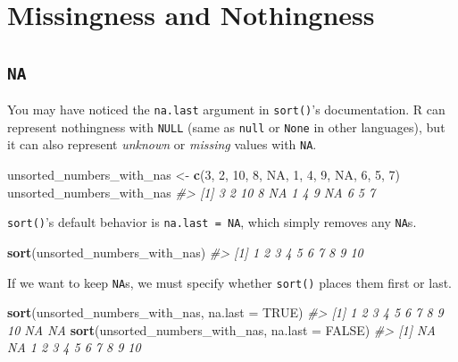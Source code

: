 \documentclass[
]{report}
\newenvironment{Shaded}{\begin{snugshade}}{\end{snugshade}}
\newcommand{\CommentTok}[1]{\textcolor[rgb]{0.56,0.35,0.01}{\textit{#1}}}
\newcommand{\DataTypeTok}[1]{\textcolor[rgb]{0.13,0.29,0.53}{#1}}
\newcommand{\DecValTok}[1]{\textcolor[rgb]{0.00,0.00,0.81}{#1}}
\newcommand{\KeywordTok}[1]{\textcolor[rgb]{0.13,0.29,0.53}{\textbf{#1}}}
\newcommand{\NormalTok}[1]{#1}
\newcommand{\OtherTok}[1]{\textcolor[rgb]{0.56,0.35,0.01}{#1}}
\newcommand{\StringTok}[1]{\textcolor[rgb]{0.31,0.60,0.02}{#1}}
\begin{document}
\hypertarget{missingness-and-nothingness}{%
\section{Missingness and Nothingness}\label{missingness-and-nothingness}}

\hypertarget{na}{%
\subsection{\texorpdfstring{\texttt{NA}}{NA}}\label{na}}

You may have noticed the \texttt{na.last} argument in \texttt{sort()}'s documentation. R can represent nothingness with \texttt{NULL} (same as \texttt{null} or \texttt{None} in other languages), but it can also represent \emph{unknown} or \emph{missing} values with \texttt{NA}.

\begin{Shaded}
\begin{Highlighting}[]
\NormalTok{unsorted\_numbers\_with\_nas \textless{}{-}}\StringTok{ }\KeywordTok{c}\NormalTok{(}\DecValTok{3}\NormalTok{, }\DecValTok{2}\NormalTok{, }\DecValTok{10}\NormalTok{, }\DecValTok{8}\NormalTok{, }\OtherTok{NA}\NormalTok{, }\DecValTok{1}\NormalTok{, }\DecValTok{4}\NormalTok{, }\DecValTok{9}\NormalTok{, }\OtherTok{NA}\NormalTok{, }\DecValTok{6}\NormalTok{, }\DecValTok{5}\NormalTok{, }\DecValTok{7}\NormalTok{)}
\NormalTok{unsorted\_numbers\_with\_nas}
\CommentTok{\#\textgreater{}  [1]  3  2 10  8 NA  1  4  9 NA  6  5  7}
\end{Highlighting}
\end{Shaded}

\texttt{sort()}'s default behavior is \texttt{na.last\ =\ NA}, which simply removes any \texttt{NA}s.

\begin{Shaded}
\begin{Highlighting}[]
\KeywordTok{sort}\NormalTok{(unsorted\_numbers\_with\_nas)}
\CommentTok{\#\textgreater{}  [1]  1  2  3  4  5  6  7  8  9 10}
\end{Highlighting}
\end{Shaded}

If we want to keep \texttt{NA}s, we must specify whether \texttt{sort()} places them first or last.

\begin{Shaded}
\begin{Highlighting}[]
\KeywordTok{sort}\NormalTok{(unsorted\_numbers\_with\_nas, }\DataTypeTok{na.last =} \OtherTok{TRUE}\NormalTok{)}
\CommentTok{\#\textgreater{}  [1]  1  2  3  4  5  6  7  8  9 10 NA NA}
\KeywordTok{sort}\NormalTok{(unsorted\_numbers\_with\_nas, }\DataTypeTok{na.last =} \OtherTok{FALSE}\NormalTok{)}
\CommentTok{\#\textgreater{}  [1] NA NA  1  2  3  4  5  6  7  8  9 10}
\end{Highlighting}
\end{Shaded}
\end{document}
